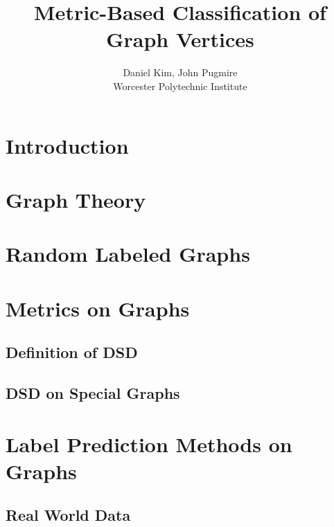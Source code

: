 \documentclass[11pt,oneside]{report}
\theoremstyle{definition}
\begin{document}
\title{Metric-Based Classification of Graph Vertices}
\author{Daniel Kim, John Pugmire\\Worcester Polytechnic Institute\\}
\maketitle
\tableofcontents


\chapter{Introduction}


\chapter{Graph Theory}



\chapter{Random Labeled Graphs}



\chapter{Metrics on Graphs}

\section{Definition of DSD}


\section{DSD on Special Graphs}



\chapter{Label Prediction Methods on Graphs}


\section{Real World Data}

\end{document}
